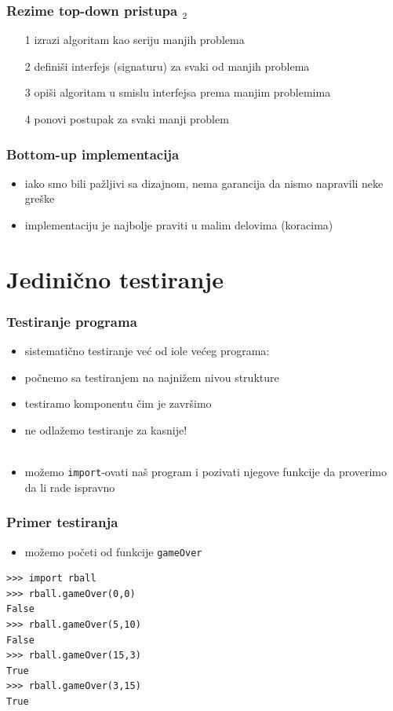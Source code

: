 \documentclass[utf8,compress]{beamer}
\begin{document}
\begin{frame}
  \frametitle{Rezime top-down pristupa $_2$}
\begin{itemize}
  \item[1] izrazi algoritam kao seriju manjih problema
  \item[2] definiši interfejs (signaturu) za svaki od manjih problema
  \item[3] opiši algoritam u smislu interfejsa prema manjim problemima
  \item[4] ponovi postupak za svaki manji problem
\end{itemize}
\end{frame}

\begin{frame}
  \frametitle{Bottom-up implementacija}
\begin{itemize}
  \item iako smo bili pažljivi sa dizajnom, nema garancija da nismo napravili neke greške
  \item implementaciju je najbolje praviti u malim delovima (koracima)
\end{itemize}
\end{frame}

\section[Testiranje]{Jedinično testiranje}

\begin{frame}
  \frametitle{Testiranje programa}
\begin{itemize}
  \item sistematično testiranje već od iole većeg programa:
  \item počnemo sa testiranjem na najnižem nivou strukture
  \item testiramo komponentu čim je završimo
  \item ne odlažemo testiranje za kasnije! \\ \ \\
  \item možemo \texttt{import}-ovati naš program i pozivati njegove funkcije da proverimo da li rade ispravno
\end{itemize}
\end{frame}

\begin{frame}[fragile]
  \frametitle{Primer testiranja}
\begin{itemize}
  \item možemo početi od funkcije \texttt{gameOver}
\end{itemize}
\begin{verbatim}
>>> import rball
>>> rball.gameOver(0,0)
False
>>> rball.gameOver(5,10)
False
>>> rball.gameOver(15,3)
True
>>> rball.gameOver(3,15)
True
\end{verbatim}
\end{frame}
\end{document}
